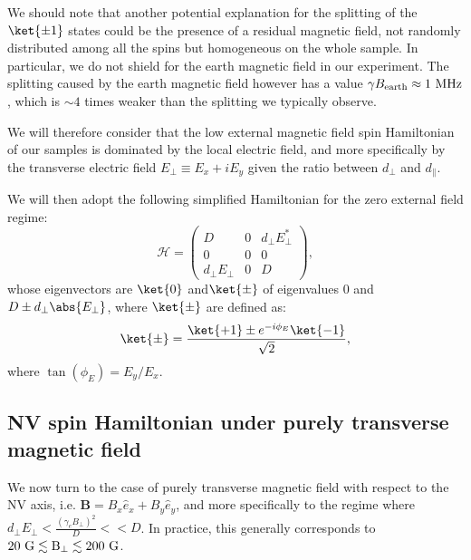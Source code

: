 \documentclass[a4paper,11pt]{report}
\begin{document}
\begin{refsection}
We should note that another potential explanation for the splitting of the $\ket{\pm 1}$ states could be the presence of a residual magnetic field, not randomly distributed among all the spins but homogeneous on the whole sample. In particular, we do not shield for the earth magnetic field in our experiment. The splitting caused by the earth magnetic field however has a value $\gamma B_{\rm earth} \approx 1\ \rm MHz$, which is $\sim 4$ times weaker than the splitting we typically observe. 

We will therefore consider that the low external magnetic field spin Hamiltonian of our samples is dominated by the local electric field, and more specifically by the transverse electric field $E_\perp\equiv E_x + i E_y$ given the ratio between $d_\perp$ and $d_\parallel$.

We will then adopt the following simplified Hamiltonian for the zero external field regime:
\begin{equation}
\mathcal{H}=\begin{pmatrix}
D&0&d_\perp E_\perp^* \\
0&0&0 \\
d_\perp E_\perp &0&D
\end{pmatrix},
\end{equation}
whose eigenvectors are $\ket{0}$ and$\ket{\pm}$ of eigenvalues 0 and $D\pm d_\perp \abs{E_\perp}$, where $\ket{\pm}$ are defined as:
\begin{equation}
\ket{\pm}=\frac{\ket{+1}\pm e^{-i\phi_E}\ket{-1}}{\sqrt{2}},
\end{equation}
where $\tan(\phi_E)=E_y/E_x$.

\subsection{NV spin Hamiltonian under purely transverse magnetic field}
\label{sec B transverse}

We now turn to the case of purely transverse magnetic field with respect to the NV axis, i.e. $\mathbf{B}=B_x \hat{e}_x + B_y \hat e_y$, and more specifically to the regime where $d_\perp E_\perp < \frac{(\gamma_e B_\perp)^2}{D} << D$. In practice, this generally corresponds to $20\ \rm G \lesssim B_\perp \lesssim 200\ \rm G$.


\end{refsection}
\end{document}
